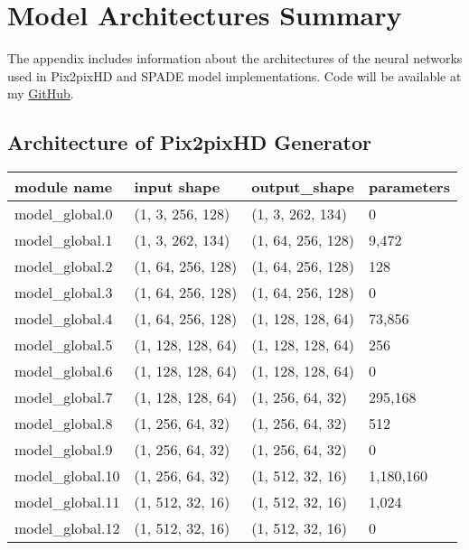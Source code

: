 \chapter{Model Architectures Summary}
The appendix includes information about the architectures of the neural networks used in 
Pix2pixHD and SPADE model implementations. 
Code will be available at my \href{https://github.com/williamlwclwc}{GitHub}. 

\section{Architecture of Pix2pixHD Generator}
\begin{longtable}{llll}
    \toprule
                        module name &        input shape &       output\_shape &  parameters \\
    \midrule
                    model\_global.0 &   (1, 3, 256, 128) &   (1, 3, 262, 134) &           0 \\
                    model\_global.1 &   (1, 3, 262, 134) &  (1, 64, 256, 128) &       9,472 \\
                    model\_global.2 &  (1, 64, 256, 128) &  (1, 64, 256, 128) &         128 \\
                    model\_global.3 &  (1, 64, 256, 128) &  (1, 64, 256, 128) &           0 \\
                    model\_global.4 &  (1, 64, 256, 128) &  (1, 128, 128, 64) &      73,856 \\
                    model\_global.5 &  (1, 128, 128, 64) &  (1, 128, 128, 64) &         256 \\
                    model\_global.6 &  (1, 128, 128, 64) &  (1, 128, 128, 64) &           0 \\
                    model\_global.7 &  (1, 128, 128, 64) &   (1, 256, 64, 32) &     295,168 \\
                    model\_global.8 &   (1, 256, 64, 32) &   (1, 256, 64, 32) &         512 \\
                    model\_global.9 &   (1, 256, 64, 32) &   (1, 256, 64, 32) &           0 \\
                    model\_global.10 &   (1, 256, 64, 32) &   (1, 512, 32, 16) &   1,180,160 \\
                    model\_global.11 &   (1, 512, 32, 16) &   (1, 512, 32, 16) &       1,024 \\
                    model\_global.12 &   (1, 512, 32, 16) &   (1, 512, 32, 16) &           0 \\

\end{longtable}
